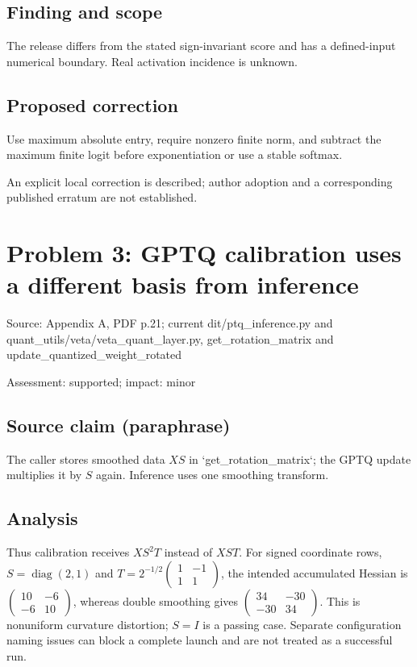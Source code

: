 \documentclass[11pt]{article}
\begin{document}
\subsection*{Finding and scope}

The release differs from the stated sign-invariant score and has a defined-input numerical boundary. Real activation incidence is unknown.

\subsection*{Proposed correction}

Use maximum absolute entry, require nonzero finite norm, and subtract the maximum finite logit before exponentiation or use a stable softmax.

An explicit local correction is described; author adoption and a corresponding published erratum are not established.

\section*{Problem 3: GPTQ calibration uses a different basis from inference}

Source: Appendix A, PDF p.21; current dit/ptq\_inference.py and quant\_utils/veta/veta\_quant\_layer.py, get\_rotation\_matrix and update\_quantized\_weight\_rotated

Assessment: supported; impact: minor

\subsection*{Source claim (paraphrase)}

The caller stores smoothed data \(XS\) in `get\_rotation\_matrix`; the GPTQ update multiplies it by \(S\) again. Inference uses one smoothing transform.

\subsection*{Analysis}

Thus calibration receives \(XS^2T\) instead of \(XST\). For signed coordinate rows, \(S=\operatorname{diag}(2,1)\) and \(T=2^{-1/2}\begin{pmatrix}1&-1\\1&1\end{pmatrix}\), the intended accumulated Hessian is \(\begin{pmatrix}10&-6\\-6&10\end{pmatrix}\), whereas double smoothing gives \(\begin{pmatrix}34&-30\\-30&34\end{pmatrix}\). This is nonuniform curvature distortion; \(S=I\) is a passing case. Separate configuration naming issues can block a complete launch and are not treated as a successful run.
\end{document}
